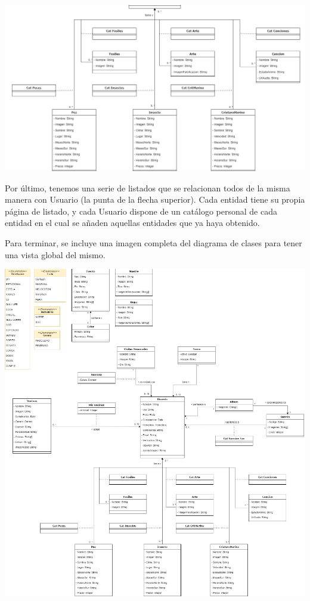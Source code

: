 		\bigskip
	
	\includegraphics[width=\textwidth]{img/cap5/diagramaclases/catalogos.png}
	
		\bigskip
	
	Por último, tenemos una serie de listados que se relacionan todos de la misma manera con Usuario (la punta de la flecha superior). Cada entidad tiene su propia página de listado, y cada Usuario dispone de un catálogo personal de cada entidad en el cual se añaden aquellas entidades que ya haya obtenido.\\
	
	\clearpage
	
	Para terminar, se incluye una imagen completa del diagrama de clases para tener una vista global del mismo.\\
	
		\bigskip
	
	\includegraphics[width=\textwidth]{img/cap5/diagramaclases/diagrama-completo.png}
	
